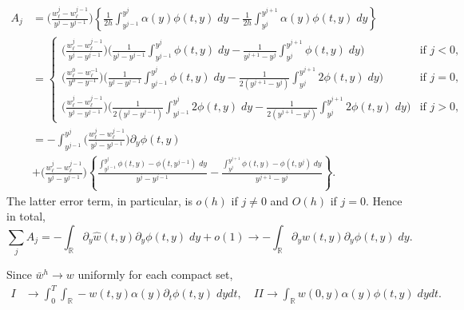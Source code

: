 \documentclass[a4paper,11pt]{article}
\theoremstyle{remark}
\begin{document}
\begin{align*}
 A_j &= \Big(\tfrac{w^{j}_{\ell} - w^{j-1}_{\ell}}{y^{j}-y^{j-1}}\Big)
        \left\{\frac{1}{2h}\int_{y^{j-1}}^{y^{j}} \alpha(y)\phi(t,y) \; dy -  \frac{1}{2h}\int_{y^{j}}^{y^{j+1}} \alpha(y)\phi(t,y) \; dy\right\}\\
     &= \left\{\begin{array}{ll} 
        \Big(\tfrac{w^{j}_{\ell} - w^{j-1}_{\ell}}{y^{j}-y^{j-1}}\Big)
        \bigg( \frac{1}{y^j-y^{j-1}}\int_{y^{j-1}}^{y^{j}} \phi(t,y) \; dy- \frac{1}{y^{j+1}-y^{j}}\int_{y^{j}}^{y^{j+1}} \phi(t,y) \; dy \bigg) & \text{if } j<0,\\
        \Big(\tfrac{w^{0}_{\ell} - w^{-1}_{\ell}}{y^{0}-y^{-1}}\Big)
        \bigg( \frac{1}{y^j-y^{j-1}}\int_{y^{j-1}}^{y^{j}} \phi(t,y) \; dy- \frac{1}{2(y^{j+1}-y^{j})}\int_{y^{j}}^{y^{j+1}} 2\phi(t,y) \; dy \bigg) & \text{if } j=0,\\
        \Big(\tfrac{w^{j}_{\ell} - w^{j-1}_{\ell}}{y^{j}-y^{j-1}}\Big)
        \bigg( \frac{1}{2(y^j-y^{j-1})}\int_{y^{j-1}}^{y^{j}} 2\phi(t,y) \; dy- \frac{1}{2(y^{j+1}-y^{j})}\int_{y^{j}}^{y^{j+1}} 2\phi(t,y) \; dy \bigg) & \text{if } j>0,        
       \end{array}\right.\\
     &=-\int_{y^{j-1}}^{y^{j}}\Big(\tfrac{w^{j}_{\ell} - w^{j-1}_{\ell}}{y^{j}-y^{j-1}}\Big)\partial_y\phi(t,y) \\
     & + \Big(\tfrac{w^{j}_{\ell} - w^{j-1}_{\ell}}{y^{j}-y^{j-1}}\Big)\left\{
        \frac{\int_{y^{j-1}}^{y^{j}} \phi(t,y)-\phi(t,y^{j-1}) \; dy}{y^j-y^{j-1}} - \frac{\int_{y^{j}}^{y^{j+1}} \phi(t,y)-\phi(t,y^{j}) \; dy}{y^{j+1}-y^j} \right\}.
\end{align*}
The latter error term, in particular, is $o(h)$ if $j\ne0$ and $O(h)$ if $j=0$. Hence in total,
$$\sum_j  A_j = -\int_\mathbb{R} \partial_y \hat{w}(t,y) \partial_y \phi(t,y) \; dy + o(1) \rightarrow -\int_\mathbb{R} \partial_y w(t,y) \partial_y \phi(t,y) \; dy.$$

Since $\bar{w}^h \rightarrow w$ uniformly for each compact set,
\begin{align*}
I &\rightarrow \int_0^T\int_\mathbb{R} -w(t,y) \alpha(y)\partial_t\phi(t,y)\; dy dt, \quad 
II \rightarrow \int_\mathbb{R} w(0,y)\alpha(y)\phi(t,y) \; dydt. 
\end{align*}
\end{document}
